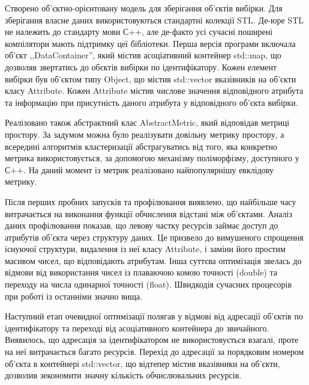         
        Створено об'єктно-орієнтовану модель для зберігання об'єктів вибірки. Для зберігання власне даних використовуються стандартні колекції STL. Де-юре STL не належить до стандарту мови С++, але де-факто усі сучасні поширені компілятори мають підтримку цеї бібліотеки. Перша версія програми включала об'єкт ,,DataContainer'', який містив асоціативний контейнер std::map, що дозволяв звертатись до обєктів вибірки по ідентифікатору. Кожен елемент вибірки був об'єктом типу Object, що містив std::vector вказівників на об'єкти класу Attribute. Кожен Attribute містив числове значення відповідного атрибута та інформацію при присутність даного атрибута у відповідного об'єкта вибірки.
        
        Реалізовано також абстрактний клас AbstractMetric, який відповідав метриці простору. За задумом можна було реалізувати довільну метрику простору, а всередині алгоритмів кластеризації абстрагуватись від того, яка конкретно метрика використовується, за допомогою механізму поліморфізму, доступного у С++. На даний момент із метрик реалізовано найпопулярнішу евклідову метрику.
        
        Після перших пробних запусків та профілювання виявлено, що найбільше часу витрачається на виконання функції обчислення відстані між об'єктами. Аналіз даних профілювання показав, що левову частку ресурсів займає доступ до атрибутів об'єкта через структуру даних. Це призвело до вимушеного спрощення існуючої структури, видалення із неї класу Attribute, і заміни його простим масивом чисел, що відповідають атрибутам. Інша суттєва оптимізація звелась до відмови від використання чисел із плаваючою комою точності (double) та переходу на числа одинарної точності (float). Швидкодія сучасних процесорів при роботі із останніми значно вища.
        
        Наступний етап очевидної оптимізації полягав у відмові від адресації об'єктів по ідентифікатору та переході від асоціативного контейнера до звичайного. Виявилось, що адресація за ідентифікатором не використовується взагалі, проте на неї витрачається багато ресурсів. Перехід до адресації за порядковим номером об'єкта в контейнері std::vector, що відтепер містив вказівники на об'єкти, дозволив зекономити значну кількість обчислювальних ресурсів.
        
